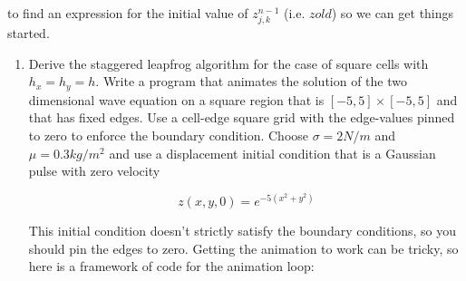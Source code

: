 to find an expression for the initial value of $z^{n-1}_{j,k}$ (i.e. $zold$) so we can get things
started.
\begin{problem}\label{P6.2} 

\begin{enumerate}[label=(\alph*)]
	\item Derive the staggered leapfrog algorithm for the case of square cells
with $h_x = h_y = h$. Write a program that animates the solution of the
two dimensional wave equation on a square region that is $[−5,5] ×
[−5,5]$ and that has fixed edges. Use a cell-edge square grid with
the edge-values pinned to zero to enforce the boundary condition.
Choose $\sigma = 2 N/m$ and $ \mu = 0.3 kg/m^2$
and use a displacement initial
condition that is a Gaussian pulse with zero velocity

\begin{equation}\label{eq:67}
z(x,y,0) = e^{-5(x^2+y^2)}
\end{equation}

This initial condition doesn\rq t strictly satisfy the boundary conditions,
so you should pin the edges to zero.
Getting the animation to work can be tricky, so here is a framework of
code for the animation loop:


\end{enumerate}
\end{problem}
